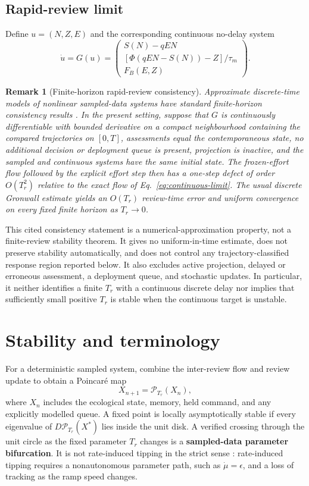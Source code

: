 \documentclass[11pt]{article}
\newtheorem{remark}{Remark}
\begin{document}
\subsection{Rapid-review limit}

Define $u=(N,Z,E)$ and the corresponding continuous no-delay system
\begin{equation}
\dot u=G(u)=
\begin{pmatrix}
S(N)-qEN\\
[\Phi(qEN-S(N))-Z]/\tau_m\\
F_B(E,Z)
\end{pmatrix}.
\label{eq:continuous-limit}
\end{equation}

\begin{remark}[Finite-horizon rapid-review consistency]
Approximate discrete-time models of nonlinear sampled-data systems have standard finite-horizon consistency results \cite{nesic2004}. In the present setting, suppose that $G$ is continuously differentiable with bounded derivative on a compact neighbourhood containing the compared trajectories on $[0,T]$, assessments equal the contemporaneous state, no additional decision or deployment queue is present, projection is inactive, and the sampled and continuous systems have the same initial state. The frozen-effort flow followed by the explicit effort step then has a one-step defect of order $O(T_r^2)$ relative to the exact flow of Eq.~\eqref{eq:continuous-limit}. The usual discrete Gronwall estimate yields an $O(T_r)$ review-time error and uniform convergence on every fixed finite horizon as $T_r\to0$.
\end{remark}

This cited consistency statement is a numerical-approximation property, not a finite-review stability theorem. It gives no uniform-in-time estimate, does not preserve stability automatically, and does not control any trajectory-classified response region reported below. It also excludes active projection, delayed or erroneous assessment, a deployment queue, and stochastic updates. In particular, it neither identifies a finite $T_r$ with a continuous discrete delay nor implies that sufficiently small positive $T_r$ is stable when the continuous target is unstable.

\section{Stability and terminology}

For a deterministic sampled system, combine the inter-review flow and review update to obtain a Poincar\'e map
\[
X_{n+1}=\mathcal P_{T_r}(X_n),
\]
where $X_n$ includes the ecological state, memory, held command, and any explicitly modelled queue. A fixed point is locally asymptotically stable if every eigenvalue of $D\mathcal P_{T_r}(X^*)$ lies inside the unit disk. A verified crossing through the unit circle as the fixed parameter $T_r$ changes is a \textbf{sampled-data parameter bifurcation}. It is not rate-induced tipping in the strict sense \cite{ashwin2012}: rate-induced tipping requires a nonautonomous parameter path, such as $\dot\mu=\epsilon$, and a loss of tracking as the ramp speed changes.
\end{document}
